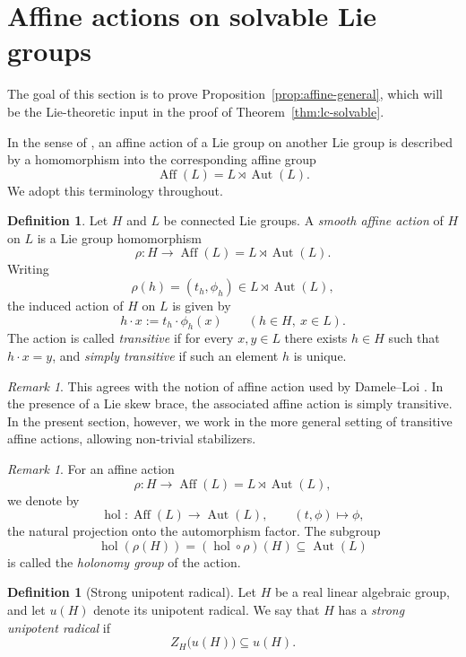 \documentclass[reqno]{amsart}
\numberwithin{equation}{section}
\theoremstyle{definition}
\newtheorem{definition}[theorem]{Definition}
\theoremstyle{remark}
\newtheorem{remark}[theorem]{Remark}
\DeclareMathOperator{\Aut}{Aut}
\DeclareMathOperator{\Aff}{Aff}
\begin{document}
\section{Affine actions on solvable Lie groups}\label{sec:affine-actions}
The goal of this section is to prove Proposition~\ref{prop:affine-general},
which will be the Lie-theoretic input in the proof of
Theorem~\ref{thm:lc-solvable}.

In the sense of \cite{DameleLoi2026}, an affine action of a Lie group on
another Lie group is described by a homomorphism into the corresponding affine
group
\[
\Aff(L)=L\rtimes \Aut(L).
\]
We adopt this terminology throughout.

\begin{definition}\label{def:affine-action}
Let $H$ and $L$ be connected Lie groups. A \emph{smooth affine action} of $H$
on $L$ is a Lie group homomorphism
\[
\rho\colon H\longrightarrow \Aff(L)=L\rtimes \Aut(L).
\]
Writing
\[
\rho(h)=(t_h,\phi_h)\in L\rtimes \Aut(L),
\]
the induced action of $H$ on $L$ is given by
\[
h\cdot x:=t_h\cdot \phi_h(x)
\qquad (h\in H,\ x\in L).
\]
The action is called \emph{transitive} if for every $x,y\in L$ there exists
$h\in H$ such that $h\cdot x=y$, and \emph{simply transitive} if such an
element $h$ is unique.
\end{definition}

\begin{remark}\label{rem:damele-loi}
This agrees with the notion of affine action used by Damele--Loi \cite{DameleLoi2026}. In the
presence of a Lie skew brace, the associated affine action is simply transitive.
In the present section, however, we work in the more general setting of
transitive affine actions, allowing non-trivial stabilizers.
\end{remark}

\begin{remark}\label{rem:holonomy}
For an affine action
\[
\rho\colon H\to \Aff(L)=L\rtimes \Aut(L),
\]
we denote by
\[
\operatorname{hol}\colon \Aff(L)\longrightarrow \Aut(L),
\qquad
(t,\phi)\longmapsto \phi,
\]
the natural projection onto the automorphism factor. The subgroup
\[
\operatorname{hol}(\rho(H))=(\operatorname{hol}\circ \rho)(H)\subseteq \Aut(L)
\]
is called the \emph{holonomy group} of the action.
\end{remark}

\begin{definition}[Strong unipotent radical]
Let $H$ be a real linear algebraic group, and let $u(H)$ denote its unipotent
radical. We say that $H$ has a \emph{strong unipotent radical} if
\[
Z_H\bigl(u(H)\bigr)\subseteq u(H).
\]
\end{definition}
\end{document}
